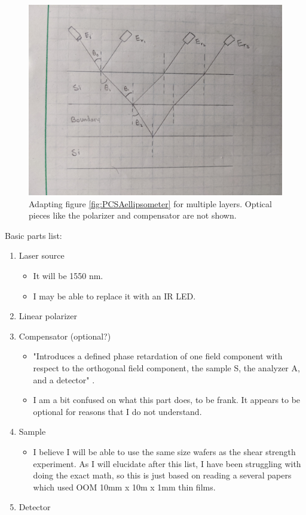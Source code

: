 \documentclass[colorlinks=true,pdfstartview=FitV,linkcolor=blue,
            citecolor=red,urlcolor=magenta]{ligodoc}
\begin{document}
\begin{appendices}
\begin{figure}[htbp]
\begin{center}
\includegraphics[width=6in]{graphics/my_ellipsometry.jpg}
\caption{Adapting figure \ref{fig:PCSAellipsometer} for multiple layers. Optical pieces like the polarizer and compensator are not shown.}
\label{fig:myellipsometer}
\end{center}
\end{figure}

\newpage

Basic parts list:

\begin{enumerate}
    \item Laser source
        \begin{itemize}
        \item It will be 1550 nm.
        \item I may be able to replace it with an IR LED.
        \end{itemize}
    \item Linear polarizer
    \item Compensator (optional?)
        \begin{itemize}
        \item "Introduces a defined phase retardation of one field component with respect to the orthogonal field component, the sample S, the analyzer A, and a detector" \cite{Kurz}.
        \item I am a bit confused on what this part does, to be frank. It appears to be optional for reasons that I do not understand.
        \end{itemize}
    \item Sample
        \begin{itemize}
        \item I believe I will be able to use the same size wafers as the shear strength experiment. As I will elucidate after this list, I have been struggling with doing the exact math, so this is just based on reading a several papers which used OOM 10mm x 10m x 1mm thin films.
        \end{itemize}
    \item Detector
\end{enumerate}


\end{appendices}
\end{document}
